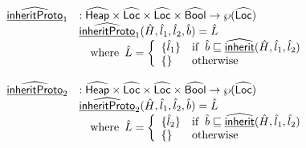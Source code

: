 \[\begin{array}{ll}
\ahf {inheritProto}_1 &:  \aHeap \times \aLoc \times \aLoc \times \abs{Bool} \rightarrow \powerset{\aLoc}\\
& \ahf {inheritProto}_1 (\hat{H}, \hat{l}_1, \hat{l}_2, \hat{b}) = \hat{L}\\
& \quad \wherec{
  \hat{L} = \left\{
    \begin{array}{ll}
      \{ \hat{l}_1 \} & \ifc{ \hat{b} \sqsubseteq \ahf{inherit}(\hat{H}, \hat{l}_1, \hat{l}_2)}\\
      \{ \} & \owc\\
    \end{array}
  \right.\\
}
\\\\
\ahf {inheritProto}_2 &:  \aHeap \times \aLoc \times \aLoc \times \abs{Bool} \rightarrow \powerset{\aLoc}\\
& \ahf {inheritProto}_2 (\hat{H}, \hat{l}_1, \hat{l}_2, \hat{b}) = \hat{L}\\
& \quad \wherec{
  \hat{L} = \left\{
    \begin{array}{ll}
      \{ \hat{l}_2 \} & \ifc{ \hat{b} \sqsubseteq \ahf{inherit}(\hat{H}, \hat{l}_1, \hat{l}_2)}\\
      \{ \} & \owc\\
    \end{array}
  \right.\\
}
\\\\
 \end{array}
\]
